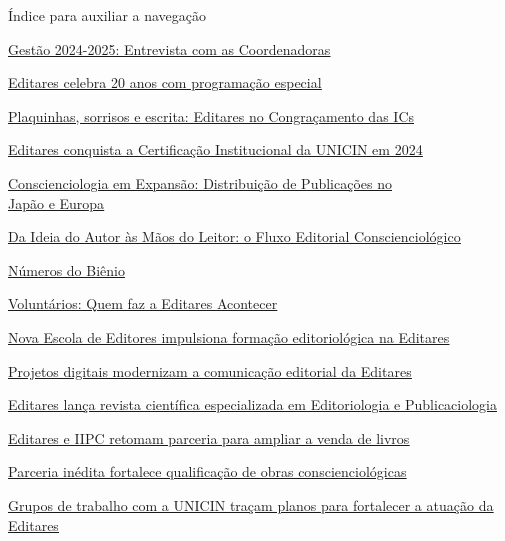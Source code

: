 \documentclass[
]{article}
\author{}
\date{}
\begin{document}
Índice para auxiliar a navegação

\hyperref[gestuxe3o-2024-2025-entrevista-com-as-coordenadoras]{\ul{Gestão 2024-2025: Entrevista com as Coordenadoras}}

\hyperref[editares-celebra-20-anos-com-programauxe7uxe3o-especial]{\ul{Editares celebra 20 anos com programação especial}}

\hyperref[plaquinhas-sorrisos-e-escrita-editares-no-congrauxe7amento-das-ics]{\ul{Plaquinhas, sorrisos e escrita: Editares no Congraçamento das ICs}}

\hyperref[editares-conquista-a-certificauxe7uxe3o-institucional-da-unicin-em-2024]{\ul{Editares conquista a Certificação Institucional da UNICIN em 2024}}

\hyperref[conscienciologia-em-expansuxe3o-distribuiuxe7uxe3o-de-publicauxe7uxf5es-no-japuxe3o-e-europa]{\ul{Conscienciologia em Expansão: Distribuição de Publicações no\\
Japão e Europa}}

\hyperref[da-ideia-do-autor-uxe0s-muxe3os-do-leitor-o-fluxo-editorial-consciencioluxf3gico]{\ul{Da Ideia do Autor às Mãos do Leitor: o Fluxo Editorial Conscienciológico}}

\hyperref[nuxfameros-do-biuxeanio]{\ul{Números do Biênio}}

\hyperref[voluntuxe1rios-quem-faz-a-editares-acontecer]{\ul{Voluntários: Quem faz a Editares Acontecer}}

\hyperref[nova-escola-de-editores-impulsiona-formauxe7uxe3o-editorioluxf3gica-na-editares]{\ul{Nova Escola de Editores impulsiona formação editoriológica na Editares}}

\hyperref[projetos-digitais-modernizam-a-comunicauxe7uxe3o-editorial-da-editares]{\ul{Projetos digitais modernizam a comunicação editorial da Editares}}

\hyperref[editares-lanuxe7a-revista-cientuxedfica-especializada-em-editoriologia-e-publicaciologia]{\ul{Editares lança revista científica especializada em Editoriologia e Publicaciologia}}

\hyperref[editares-e-iipc-retomam-parceria-para-ampliar-a-venda-de-livros]{\ul{Editares e IIPC retomam parceria para ampliar a venda de livros}}

\hyperref[parceria-inuxe9dita-fortalece-qualificauxe7uxe3o-de-obras-consciencioluxf3gicas]{\ul{Parceria inédita fortalece qualificação de obras conscienciológicas}}

\hyperref[grupos-de-trabalho-com-a-unicin-trauxe7am-planos-para-fortalecer-a-atuauxe7uxe3o-da-editares]{\ul{Grupos de trabalho com a UNICIN traçam planos para fortalecer a atuação da Editares}}
\end{document}
